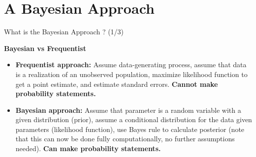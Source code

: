 \documentclass{beamer}
\begin{document}
		 
\section{A Bayesian Approach} 

\begin{frame}{What is the Bayesian Approach ? (1/3)}

    \begin{center}  
        \Large\textbf{Bayesian vs Frequentist}  
    \end{center}  
    \vspace{0.5em}

\begin{itemize}
    \item \textbf{Frequentist approach:}
     Assume data-generating process, assume that data is a realization of an unobserved population, maximize likelihood function to get a point estimate, and estimate standard errors. \textbf{Cannot make probability statements.} 
\end{itemize}

\begin{itemize}
    \item \textbf{Bayesian approach:}
     Assume that parameter is a random variable with a given distribution (prior), assume a conditional distribution for the data given parameters (likelihood function), use Bayes rule to calculate posterior (note that this can now be done fully computationally, no further assumptions needed). \textbf{Can make probability statements.}
\end{itemize}

\end{frame}
\end{document}

